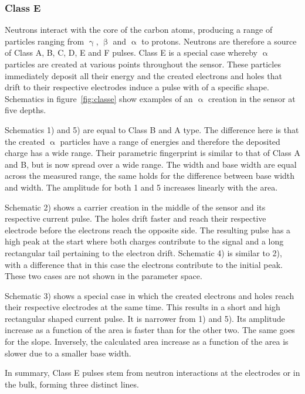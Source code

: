 \clearpage
\subsubsection{Class E}
\label{sec:classe}
Neutrons interact with the core of the carbon atoms, producing a range of particles ranging from $\upgamma$, $\upbeta$ and $\upalpha$ to protons. Neutrons are therefore a source of Class A, B, C, D, E and F pulses. Class E is a special case whereby $\upalpha$ particles are created at various points throughout the sensor. These particles immediately deposit all their energy and the created electrons and holes that drift to their respective electrodes induce a pulse with of a specific shape. Schematics in figure~\ref{fig:classe} show examples of an $\upalpha$ creation in the sensor at five depths. 

Schematics 1) and 5) are equal to Class B and A type. The difference here is that the created $\upalpha$ particles have a range of energies and therefore the deposited charge has a wide range. Their parametric fingerprint is similar to that of Class A and B, but is now spread over a wide range. The width and base width are equal across the measured range, the same holds for the difference between base width and width. The amplitude for both 1 and 5 increases linearly with the area.

Schematic 2) shows a carrier creation in the middle of the sensor and its respective current pulse. The holes drift faster and reach their respective electrode before the electrons reach the opposite side. The resulting pulse has a high peak at the start where both charges contribute to the signal and a long rectangular tail pertaining to the electron drift. Schematic 4) is similar to 2), with a difference that in this case the electrons contribute to the initial peak. These two cases are not shown in the parameter space.

Schematic 3) shows a special case in which the created electrons and holes reach their respective electrodes at the same time. This results in a short and high rectangular shaped current pulse. It is narrower from 1) and 5). Its amplitude increase as a function of the area is faster than for the other two. The same goes for the slope. Inversely, the calculated area increase as a function of the area is slower due to a smaller base width. 

In summary, Class E pulses stem from neutron interactions at the electrodes or in the bulk, forming three distinct lines.





